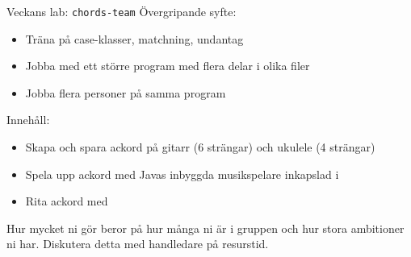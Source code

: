 


%
%


\begin{Slide}{Veckans lab: \texttt{chords-team}}\SlideFontSmall
Övergripande syfte:
\begin{itemize}
\item Träna på case-klasser, matchning, undantag
\item Jobba med ett större program med flera delar i olika filer
\item Jobba flera personer på samma program
\end{itemize}
Innehåll:
\begin{itemize}
\item Skapa och spara ackord på gitarr (6 strängar) och ukulele (4 strängar) 
\item Spela upp ackord med Javas inbyggda musikspelare inkapslad i 
\item Rita ackord med  
\end{itemize}
Hur mycket ni gör beror på hur många ni är i gruppen och hur stora ambitioner ni har. Diskutera detta med handledare på resurstid.
\end{Slide}

